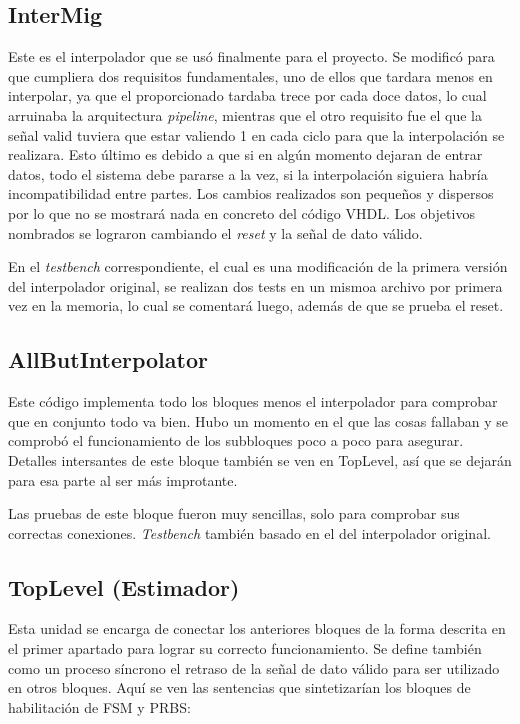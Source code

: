 \documentclass[11pt]{scrartcl} %
\begin{document}
\begin{preview}
\subsection{InterMig}

Este es el interpolador que se usó finalmente para el proyecto. Se modificó para que cumpliera dos requisitos fundamentales, uno de ellos que tardara menos en interpolar, ya que el proporcionado tardaba trece por cada doce datos, lo cual arruinaba la arquitectura \emph{pipeline}, mientras que el otro requisito fue el que la señal valid tuviera que estar valiendo 1 en cada ciclo para que la interpolación se realizara. Esto último es debido a que si en algún momento dejaran de entrar datos, todo el sistema debe pararse a la vez, si la interpolación siguiera habría incompatibilidad entre partes. Los cambios realizados son pequeños y dispersos por lo que no se mostrará nada en concreto del código VHDL. Los objetivos nombrados se lograron cambiando el \emph{reset} y la señal de dato válido.

En el \emph{testbench} correspondiente, el cual es una modificación de la primera versión del interpolador original, se realizan dos tests en un mismoa archivo por primera vez en la memoria, lo cual se comentará luego, además de que se prueba el reset.

\subsection{AllButInterpolator}

Este código implementa todo los bloques menos el interpolador para comprobar que en conjunto todo va bien. Hubo un momento en el que las cosas fallaban y se comprobó el funcionamiento de los subbloques poco a poco para asegurar. Detalles intersantes de este bloque también se ven en TopLevel, así que se dejarán para esa parte al ser más improtante.

Las pruebas de este bloque fueron muy sencillas, solo para comprobar sus correctas conexiones. \emph{Testbench} también basado en el del interpolador original.

\subsection{TopLevel (Estimador)}

Esta unidad se encarga de conectar los anteriores bloques de la forma descrita en el primer apartado para lograr su correcto funcionamiento. Se define también como un proceso síncrono el retraso de la señal de dato válido para ser utilizado en otros bloques. Aquí se ven las sentencias que sintetizarían los bloques de habilitación de FSM y PRBS:


\end{preview}
\end{document}
